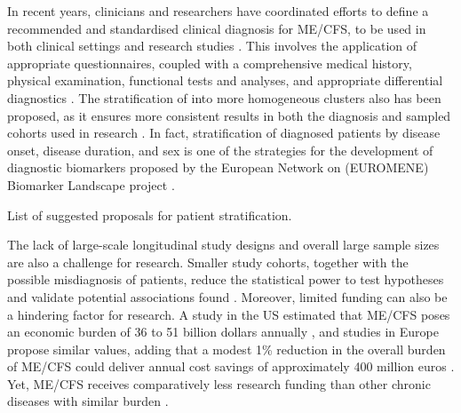 In recent years, clinicians and researchers have coordinated efforts to define a recommended and standardised clinical diagnosis for ME/CFS, to be used in both clinical settings and research studies \citep{nacul2021EuropeanNetwork}.
This involves the application of appropriate questionnaires, coupled with a comprehensive medical history, physical examination, functional tests and analyses, and appropriate differential diagnostics \citep{pheby2020DevelopmentConsistent, steiner2023UnderstandingDiagnosing}.
The stratification of \cfs into more homogeneous clusters also has been proposed, as it ensures more consistent results in both the diagnosis and sampled cohorts used in research \citep{jason2005ChronicFatigue}.
In fact, stratification of diagnosed patients by disease onset, disease duration, and sex is one of the strategies for the development of diagnostic biomarkers proposed by the European Network on \cfs (EUROMENE) Biomarker Landscape project \citep[Table~3]{scheibenbogen2017EuropeanME}.

\begin{table}[h]
    \centering
    \caption{List of suggested proposals for patient stratification.}
    \resizebox{\textwidth}{!}{}
    \label{tab:intro-stratification}
\end{table}

\bsni
The lack of large-scale longitudinal study designs and overall large sample sizes are also a challenge for \cfs research.
Smaller study cohorts, together with the possible misdiagnosis of patients, reduce the statistical power to test hypotheses and validate potential associations found \citep{malato2022ImpactMisclassification}.
Moreover, limited funding can also be a hindering factor for research.
A study in the US estimated that ME/CFS poses an economic burden of 36 to 51 billion dollars annually \citep{jason2021UpdatingNational}, and studies in Europe propose similar values, adding that a modest 1\% reduction in the overall burden of ME/CFS could deliver annual cost savings of approximately 400 million euros \citep{mccrone2003EconomicCost, pheby2020DevelopmentConsistent}.
Yet, ME/CFS receives comparatively less research funding than other chronic diseases with similar burden \citep{dimmockEstimatingDiseaseBurden2016, mirin2022UpdatedME}.

